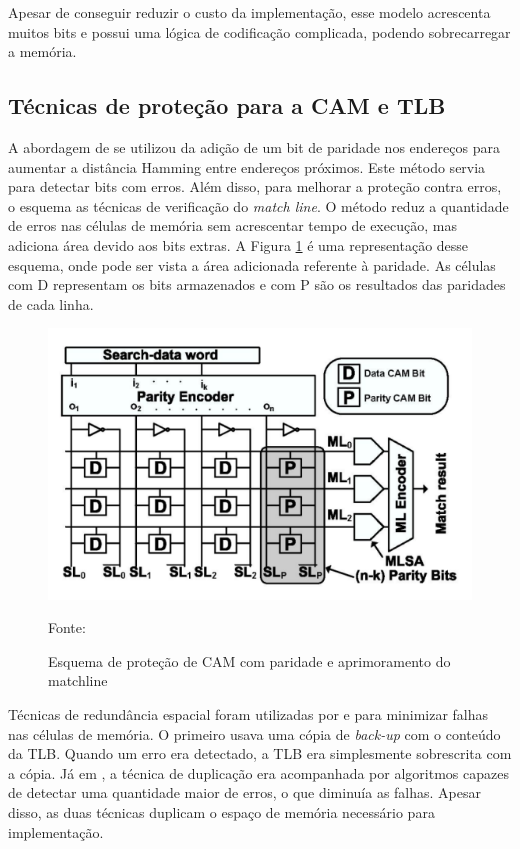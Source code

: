 Apesar de conseguir reduzir o custo da implementação, esse modelo acrescenta muitos bits e possui uma lógica de codificação complicada, podendo sobrecarregar a memória.      

\subsection{Técnicas de proteção para a CAM e TLB}

A abordagem de \cite{pagiamtzis2006soft} se utilizou da adição de um bit de paridade nos endereços para aumentar a distância Hamming entre endereços próximos. Este método servia para detectar bits com erros. Além disso, para melhorar a proteção contra erros, o esquema as técnicas de verificação do \textit{match line}. O método reduz a quantidade de erros nas células de memória sem acrescentar tempo de execução, mas adiciona área devido aos bits extras. A Figura \ref{fig:matchline} é uma representação desse esquema, onde pode ser vista a área adicionada referente à paridade. As células com D representam os bits armazenados e com P são os resultados das paridades de cada linha.

\begin{figure}[ht]
    \centering
    \includegraphics[scale = 0.7]{figuras/matchline.png}
    \caption{Esquema de proteção de CAM com paridade e aprimoramento do matchline}{Fonte: \cite{pagiamtzis2006soft}}
    \label{fig:matchline}
\end{figure}

Técnicas de redundância espacial foram utilizadas por \cite{lang2013processor} e \cite{maestro2013soft} para minimizar falhas nas células de memória. O primeiro usava uma cópia de \textit{back-up} com o conteúdo da TLB. Quando um erro era detectado, a TLB era simplesmente sobrescrita com a cópia. Já em \cite{maestro2013soft}, a técnica de duplicação era acompanhada por algoritmos capazes de detectar uma quantidade maior de erros, o que diminuía as falhas. Apesar disso, as duas técnicas duplicam o espaço de memória necessário para implementação.

